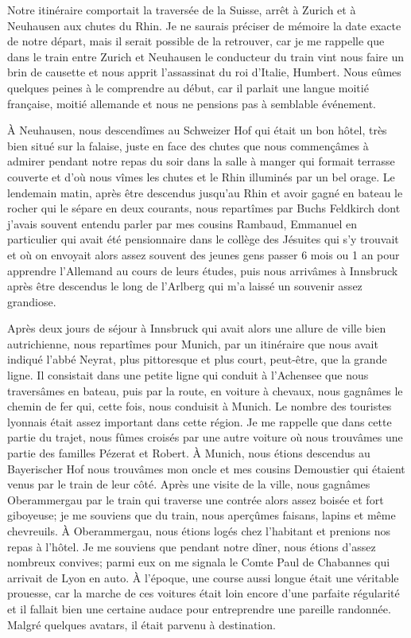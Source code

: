 \documentclass[11pt,a4paper]{report}
\begin{document}
Notre itinéraire comportait la traversée de la Suisse, arrêt à Zurich et à Neuhausen aux chutes du Rhin. Je ne saurais préciser de mémoire la date exacte de notre départ, mais il serait possible de la retrouver, car je me rappelle que dans le train entre Zurich et Neuhausen le conducteur du train vint nous faire un brin de causette et nous apprit l'assassinat du roi d'Italie, Humbert. Nous eûmes quelques peines à le comprendre au début, car il parlait une langue moitié française, moitié allemande et nous ne pensions pas à semblable événement.

À Neuhausen, nous descendîmes au Schweizer Hof qui était un bon hôtel, très bien situé sur la falaise, juste en face des chutes que nous commençâmes à admirer pendant notre repas du soir dans la salle à manger qui formait terrasse couverte et d'où nous vîmes les chutes et le Rhin illuminés par un bel orage. Le lendemain matin, après être descendus jusqu'au Rhin et avoir gagné en bateau le rocher qui le sépare en deux courants, nous repartîmes par Buchs Feldkirch dont j'avais souvent entendu parler par mes cousins Rambaud, Emmanuel en particulier qui avait été pensionnaire dans le collège des Jésuites qui s'y trouvait et où on envoyait alors assez souvent des jeunes gens passer 6 mois ou 1 an pour apprendre l'Allemand au cours de leurs études, puis nous arrivâmes à Innsbruck après être descendus le long de l'Arlberg qui m'a laissé un souvenir assez grandiose.

Après deux jours de séjour à Innsbruck qui avait alors une allure de ville bien autrichienne, nous repartîmes pour Munich, par un itinéraire que nous avait indiqué l'abbé Neyrat, plus pittoresque et plus court, peut-être, que la grande ligne. Il consistait dans une petite ligne qui conduit à l'Achensee que nous traversâmes en bateau, puis par la route, en voiture à chevaux, nous gagnâmes le chemin de fer qui, cette fois, nous conduisit à Munich. Le nombre des touristes lyonnais était assez important dans cette région. Je me rappelle que dans cette partie du trajet, nous fûmes croisés par une autre voiture où nous trouvâmes une partie des familles Pézerat et Robert. À Munich, nous étions descendus au Bayerischer Hof nous trouvâmes mon oncle et mes cousins Demoustier qui étaient venus par le train de leur côté. Après une visite de la ville, nous gagnâmes Oberammergau par le train qui traverse une contrée alors assez boisée et fort giboyeuse; je me souviens que du train, nous aperçûmes faisans, lapins et même chevreuils. À Oberammergau, nous étions logés chez l'habitant et prenions nos repas à l'hôtel. Je me souviens que pendant notre dîner, nous étions d'assez nombreux convives; parmi eux on me signala le Comte Paul de Chabannes qui arrivait de Lyon en auto. À l'époque, une course aussi longue était une véritable prouesse, car la marche de ces voitures était loin encore d'une parfaite régularité et il fallait bien une certaine audace pour entreprendre une pareille randonnée. Malgré quelques avatars, il était parvenu à destination.
\end{document}
